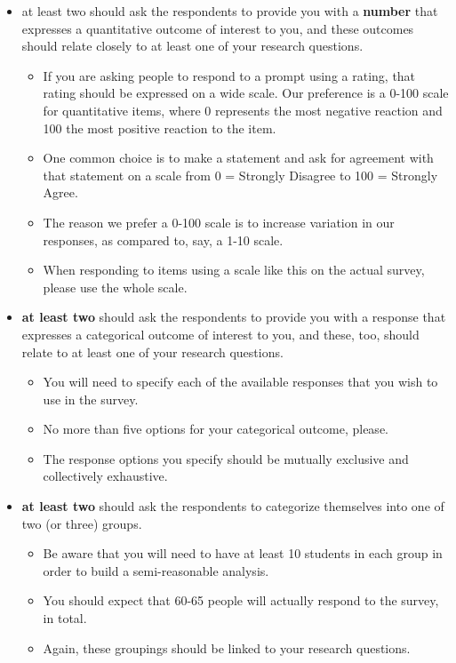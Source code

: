 \documentclass[]{book}
\providecommand{\tightlist}{%
  \setlength{\itemsep}{0pt}\setlength{\parskip}{0pt}}
\begin{document}
\begin{itemize}
\tightlist
\item
  at least two should ask the respondents to provide you with a \textbf{number} that expresses a quantitative outcome of interest to you, and these outcomes should relate closely to at least one of your research questions.

  \begin{itemize}
  \tightlist
  \item
    If you are asking people to respond to a prompt using a rating, that rating should be expressed on a wide scale. Our preference is a 0-100 scale for quantitative items, where 0 represents the most negative reaction and 100 the most positive reaction to the item.
  \item
    One common choice is to make a statement and ask for agreement with that statement on a scale from 0 = Strongly Disagree to 100 = Strongly Agree.
  \item
    The reason we prefer a 0-100 scale is to increase variation in our responses, as compared to, say, a 1-10 scale.
  \item
    When responding to items using a scale like this on the actual survey, please use the whole scale.
  \end{itemize}
\item
  \textbf{at least two} should ask the respondents to provide you with a response that expresses a categorical outcome of interest to you, and these, too, should relate to at least one of your research questions.

  \begin{itemize}
  \tightlist
  \item
    You will need to specify each of the available responses that you wish to use in the survey.
  \item
    No more than five options for your categorical outcome, please.
  \item
    The response options you specify should be mutually exclusive and collectively exhaustive.
  \end{itemize}
\item
  \textbf{at least two} should ask the respondents to categorize themselves into one of two (or three) groups.

  \begin{itemize}
  \tightlist
  \item
    Be aware that you will need to have at least 10 students in each group in order to build a semi-reasonable analysis.
  \item
    You should expect that 60-65 people will actually respond to the survey, in total.
  \item
    Again, these groupings should be linked to your research questions.
  \end{itemize}
\end{itemize}
\end{document}
